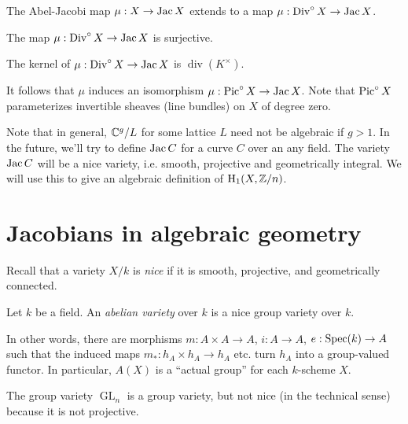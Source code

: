 \documentclass{article}
\begin{document}
The Abel-Jacobi map $\mu:X\to \operatorname{Jac} X$ extends to a map 
$\mu:\operatorname{Div}^\circ X\to \operatorname{Jac} X$. 

\begin{theorem}[Jacobi]
The map $\mu:\operatorname{Div}^\circ X\to\operatorname{Jac} X$ is surjective.
\end{theorem}

\begin{theorem}[Abel]
The kernel of $\mu:\operatorname{Div}^\circ X\to \operatorname{Jac} X$ is $\operatorname{div}(K^\times)$. 
\end{theorem}

It follows that $\mu$ induces an isomorphism $\mu:\operatorname{Pic}^\circ X\to \operatorname{Jac} X$. 
Note that $\operatorname{Pic}^\circ X$ parameterizes invertible sheaves (line bundles) on 
$X$ of degree zero. 

Note that in general, $\mathbb{C}^g/L$ for some lattice $L$ need not be 
algebraic if $g>1$. In the future, we'll try to define $\operatorname{Jac} C$ for a curve 
$C$ over an any field. The variety $\operatorname{Jac} C$ will be a nice variety, i.e. 
smooth, projective and geometrically integral. We will use this to give an 
algebraic definition of $\operatorname{H}_1(X,\mathbb{Z}/n)$. 





\section{Jacobians in algebraic geometry}

Recall that a variety $X/k$ is \emph{nice} if it is smooth, projective, and 
geometrically connected. 

\begin{definition}
Let $k$ be a field. An \emph{abelian variety} over $k$ is a nice group variety 
over $k$.
\end{definition}

In other words, there are morphisms $m:A\times A\to A$, $i:A\to A$, 
$e:\operatorname{Spec}(k)\to A$ such that the induced maps $m_*:h_A\times h_A\to h_A$ etc. 
turn $h_A$ into a group-valued functor. In particular, $A(X)$ is a ``actual 
group'' for each $k$-scheme $X$. 

\begin{example}
The group variety $\operatorname{GL}_n$ is a group variety, but not nice (in 
the technical sense) because it is not projective.
\end{example}
\end{document}

